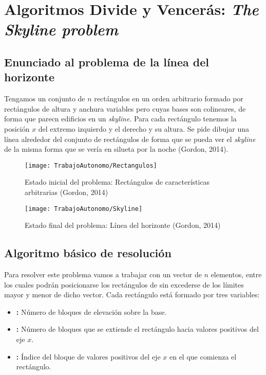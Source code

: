 \chapter{Algoritmos Divide y Vencerás: \textit{The Skyline problem}}

\section{Enunciado al problema de la línea del horizonte}

\begin{displayquote}
Tengamos un conjunto de $n$ rectángulos en un orden arbitrario formado por rectángulos de altura y anchura variables pero cuyas bases son colineares, de forma que parecn edificios en un \textit{skyline}.
Para cada rectángulo tenemos la posición $x$ del extremo izquierdo y el derecho y su altura.
Se pide dibujar una línea alrededor del conjunto de rectángulos de forma que se pueda ver el \textit{skyline} de la misma forma que se vería en silueta por la noche (Gordon, 2014).
\end{displayquote}

\begin{figure}[h]
\begin{center}
	\texttt{[image: TrabajoAutonomo/Rectangulos]}
	\caption{Estado inicial del problema: Rectángulos de características arbitrarias (Gordon, 2014)}
\end{center}
\end{figure}

\begin{figure}[h]
\begin{center}
	\texttt{[image: TrabajoAutonomo/Skyline]}
	\caption{Estado final del problema: Línea del horizonte (Gordon, 2014)}
\end{center}
\end{figure}

\pagebreak

\section{Algoritmo básico de resolución}

Para resolver este problema vamos a trabajar con un vector  de $n$ elementos, entre los cuales podrán posicionarse los rectángulos de sin excederse de los límites mayor y menor de dicho vector.
Cada rectángulo está formado por tres variables:

\begin{itemize}
	\item{}\textbf{:} Número de bloques de elevación sobre la base.
	\item{}\textbf{:} Número de bloques que se extiende el rectángulo hacia valores positivos del eje $x$.
	\item{}\textbf{:} Índice del bloque de valores positivos del eje $x$ en el que comienza el rectángulo.
\end{itemize}

